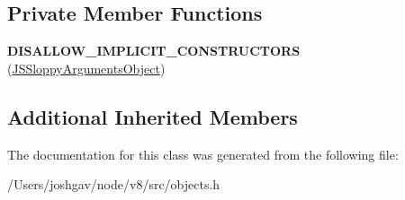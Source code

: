 \subsection*{Private Member Functions}
\begin{DoxyCompactItemize}
\item 
{\bfseries D\+I\+S\+A\+L\+L\+O\+W\+\_\+\+I\+M\+P\+L\+I\+C\+I\+T\+\_\+\+C\+O\+N\+S\+T\+R\+U\+C\+T\+O\+RS} (\hyperlink{classv8_1_1internal_1_1_j_s_sloppy_arguments_object}{J\+S\+Sloppy\+Arguments\+Object})\hypertarget{classv8_1_1internal_1_1_j_s_sloppy_arguments_object_afce5ca3f498894b998921ce15d13e87f}{}\label{classv8_1_1internal_1_1_j_s_sloppy_arguments_object_afce5ca3f498894b998921ce15d13e87f}

\end{DoxyCompactItemize}
\subsection*{Additional Inherited Members}


The documentation for this class was generated from the following file\+:\begin{DoxyCompactItemize}
\item 
/\+Users/joshgav/node/v8/src/objects.\+h\end{DoxyCompactItemize}
